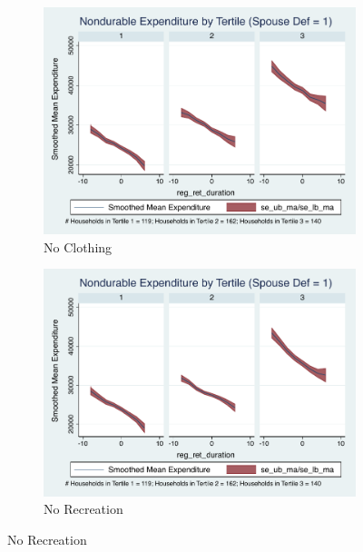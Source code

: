 \documentclass[11pt,onecolumn]{article}
\numberwithin{figure}{section}
\begin{document}
\begin{figure}
  \begin{subfigure}{0.5\textwidth}
  \centering
 	\includegraphics[width=0.9\linewidth]{../ConsumptionPostRetirement_by_SpouseDef/Smoothed/post_2005/no_clothing_spouse_def_1.pdf}
    \caption{No Clothing}
    \label{fig:chapter001_dist_001}
  \end{subfigure}
  	\hspace{1cm}
  \begin{subfigure}{0.5\textwidth}
 	\includegraphics[width=0.9\linewidth]{../ConsumptionPostRetirement_by_SpouseDef/Smoothed/post_2005/no_recreation_spouse_def_1.pdf}
    \caption{No Recreation}
    \label{fig:chapter001_reward_001}
  \end{subfigure}
  
\end{figure}
\clearpage
\end{document}
